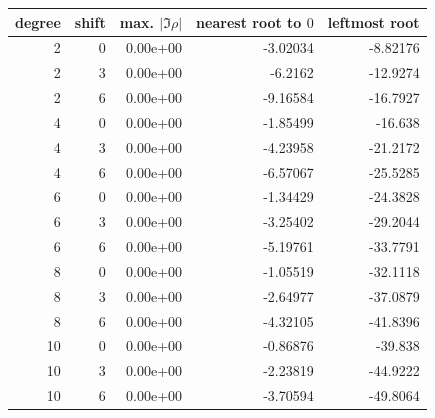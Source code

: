 \begin{tabular}{@{}rrrrr@{}}
\toprule
degree & shift & max. $|\Im\rho|$ & nearest root to $0$ & leftmost root \\
\midrule
2 & 0 & 0.00e+00 & -3.02034 & -8.82176 \\
2 & 3 & 0.00e+00 & -6.2162 & -12.9274 \\
2 & 6 & 0.00e+00 & -9.16584 & -16.7927 \\
4 & 0 & 0.00e+00 & -1.85499 & -16.638 \\
4 & 3 & 0.00e+00 & -4.23958 & -21.2172 \\
4 & 6 & 0.00e+00 & -6.57067 & -25.5285 \\
6 & 0 & 0.00e+00 & -1.34429 & -24.3828 \\
6 & 3 & 0.00e+00 & -3.25402 & -29.2044 \\
6 & 6 & 0.00e+00 & -5.19761 & -33.7791 \\
8 & 0 & 0.00e+00 & -1.05519 & -32.1118 \\
8 & 3 & 0.00e+00 & -2.64977 & -37.0879 \\
8 & 6 & 0.00e+00 & -4.32105 & -41.8396 \\
10 & 0 & 0.00e+00 & -0.86876 & -39.838 \\
10 & 3 & 0.00e+00 & -2.23819 & -44.9222 \\
10 & 6 & 0.00e+00 & -3.70594 & -49.8064 \\
\bottomrule
\end{tabular}
